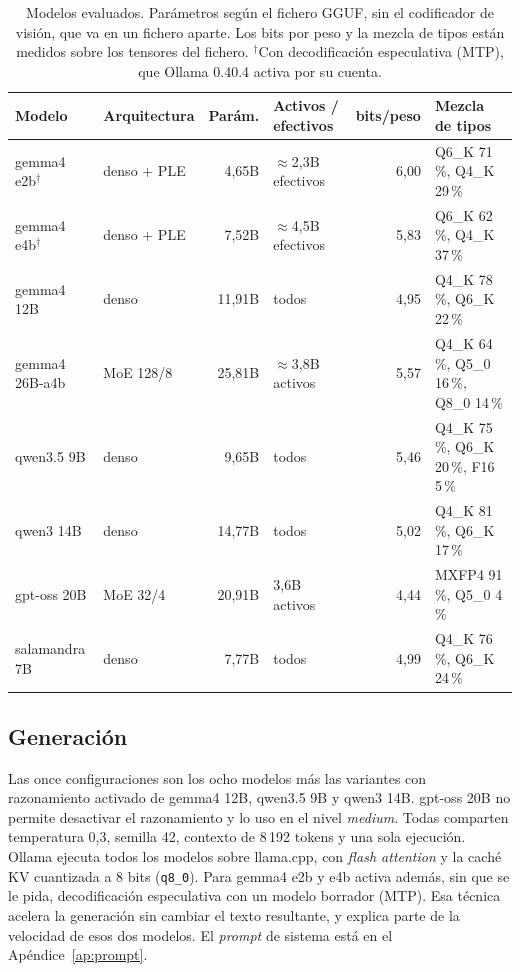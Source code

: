 \documentclass{article}
\begin{document}
\begin{table}[t]
  \caption{Modelos evaluados. Parámetros según el fichero GGUF, sin el
  codificador de visión, que va en un fichero aparte. Los bits por peso y la
  mezcla de tipos están medidos sobre los tensores del fichero.
  $^{\dagger}$Con decodificación especulativa (MTP), que Ollama 0.40.4 activa
  por su cuenta.}
  \label{tab:modelos}
  \centering
  \small
  \begin{tabular}{llrlrl}
    \toprule
    Modelo & Arquitectura & Parám. & Activos / efectivos & bits/peso & Mezcla de tipos \\
    \midrule
    gemma4 e2b$^{\dagger}$ & denso + PLE & 4,65B  & $\approx$2,3B efectivos & 6,00 & Q6\_K 71\,\%, Q4\_K 29\,\% \\
    gemma4 e4b$^{\dagger}$ & denso + PLE & 7,52B  & $\approx$4,5B efectivos & 5,83 & Q6\_K 62\,\%, Q4\_K 37\,\% \\
    gemma4 12B       & denso       & 11,91B & todos                   & 4,95 & Q4\_K 78\,\%, Q6\_K 22\,\% \\
    gemma4 26B-a4b   & MoE 128/8   & 25,81B & $\approx$3,8B activos   & 5,57 & Q4\_K 64\,\%, Q5\_0 16\,\%, Q8\_0 14\,\% \\
    qwen3.5 9B       & denso       & 9,65B  & todos                   & 5,46 & Q4\_K 75\,\%, Q6\_K 20\,\%, F16 5\,\% \\
    qwen3 14B        & denso       & 14,77B & todos                   & 5,02 & Q4\_K 81\,\%, Q6\_K 17\,\% \\
    gpt-oss 20B      & MoE 32/4    & 20,91B & 3,6B activos            & 4,44 & MXFP4 91\,\%, Q5\_0 4\,\% \\
    salamandra 7B    & denso       & 7,77B  & todos                   & 4,99 & Q4\_K 76\,\%, Q6\_K 24\,\% \\
    \bottomrule
  \end{tabular}
\end{table}

\subsection{Generación}

Las once configuraciones son los ocho modelos más las variantes con
razonamiento activado de gemma4 12B, qwen3.5 9B y qwen3 14B. gpt-oss 20B no
permite desactivar el razonamiento y lo uso en el nivel \emph{medium}. Todas
comparten temperatura 0,3, semilla 42, contexto de 8\,192 tokens y una sola
ejecución. Ollama ejecuta todos los modelos sobre llama.cpp, con \emph{flash
attention} y la caché KV cuantizada a 8 bits (\texttt{q8\_0}). Para gemma4
e2b y e4b activa además, sin que se le pida, decodificación especulativa con
un modelo borrador (MTP). Esa técnica acelera la generación sin cambiar el
texto resultante, y explica parte de la velocidad de esos dos modelos. El
\emph{prompt} de sistema está en el Apéndice~\ref{ap:prompt}.
\end{document}
